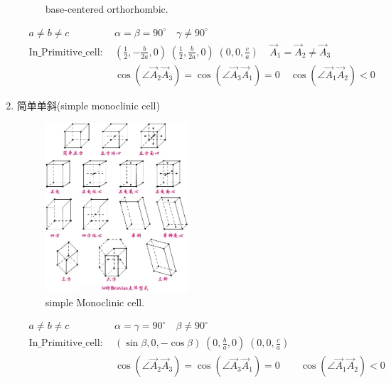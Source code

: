 \documentclass{article}      %
\begin{document}
\begin{enumerate}
\begin{figure}[h!]
\caption{\small base-centered orthorhombic.}%
\label{Bravais:orthorhombic-base-centered}
\end{figure}
\begin{displaymath}
	\begin{aligned}
		&a\neq b\neq c &\alpha=\beta=90^{\circ}\quad\gamma\neq90^{\circ} \\
	&\mathrm{In\_Primitive\_cell}:~&(\frac12,-\frac{b}{2a},0)\;(\frac12,\frac{b}{2a},0)\;(0,0,\frac{c}{a})\;\;\;\;\vec A_1=\vec A_2\neq\vec A_3\\
		& &\cos(\angle\vec A_2\vec A_3)=\cos(\angle\vec A_3\vec A_1)=0\quad\cos(\angle\vec A_1\vec A_2)<0
	\end{aligned}
\end{displaymath}
		\item 简单单斜(\textrm{simple monoclinic cell})
\begin{figure}[h!]
\centering
\includegraphics[width=0.5\textwidth,viewport=250 185 375 330,clip]{Bravias.jpg}
\caption{\small simple Monoclinic cell.}%
\label{Bravais:monoclinic}
\end{figure}
\begin{displaymath}
	\begin{aligned}
		&a\neq b\neq c &\alpha=\gamma=90^{\circ}\quad\beta\neq90^{\circ} \\
	&\mathrm{In\_Primitive\_cell}:~&(\sin\beta,0,-\cos\beta)\;(0,\frac{b}{a},0)\;(0,0,\frac{c}{a})\\
		& &\cos(\angle\vec A_2\vec A_3)=\cos(\angle\vec A_3\vec A_1)=0\qquad\cos(\angle\vec A_1\vec A_2)<0
	\end{aligned}
\end{displaymath}

\end{enumerate}
\end{document}
